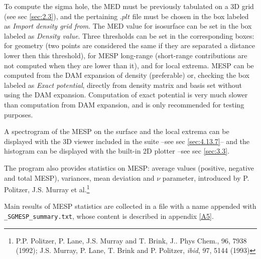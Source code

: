\documentclass[10pt]{article}
\begin{document}
To compute the sigma hole, the MED must be previously tabulated on a 3D grid (see sec \ref{sec:2.3}), and the pertaining $.plt$ 
file must be chosen in the box labeled as {\it Import density grid from}. 
The MED value for isosurface can be set in the box labeled as {\it Density value}.
Three thresholds can be set in the corresponding boxes: for geometry (two points are considered the 
same if they are separated a distance lower then this threshold), for MESP long-range (short-range 
contributions are not computed when they are lower than it), and for local extrema. MESP can be 
computed from the DAM expansion of density (preferable) or, checking the
box labeled as {\it Exact potential}, directly from density 
matrix and basis set without using the DAM expansion. Computation of exact potential is very much 
slower than computation from DAM expansion, and is only recommended for testing purposes. 

A spectrogram of the MESP on the surface and the local extrema can be displayed with the 3D viewer 
included in the suite  --see sec \ref{sec:4.13.7}-- and the histogram can be displayed with the built-in 2D plotter --see sec \ref{sec:3.3}.

The program also provides statistics on MESP: average values (positive, negative and total MESP), 
variances, mean deviation and $\nu$ parameter, introduced by P. Politzer, J.S. Murray et al.\footnote{P.P. Politzer, P. Lane, J.S. Murray and T. Brink, J.. Phys Chem., 96, 7938 (1992); J.S. Murray, P. Lane, T. Brink and P. Politzer, {\it ibid}, 97, 5144 (1993)}

Main results of MESP statistics are collected in a file with a name appended with 
\texttt{\_SGMESP\_summary.txt}, whose content is described in appendix \ref{A5}.
\end{document}
